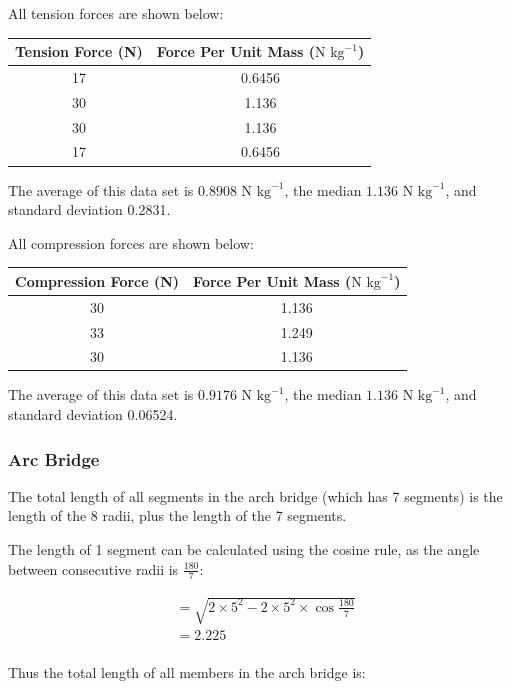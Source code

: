 \documentclass[a4paper,11pt]{article}
\begin{document}
All tension forces are shown below:

\begin{center}
\begin{tabular}{|c|c|}
\hline
Tension Force (N) & Force Per Unit Mass ($\mbox{N kg}^{-1}$) \\
\hline
17 & 0.6456 \\
30 & 1.136 \\
30 & 1.136 \\
17 & 0.6456 \\
\hline
\end{tabular}
\end{center}

The average of this data set is $0.8908\mbox{ N kg}^{-1}$, the median
$1.136\mbox{ N kg}^{-1}$, and standard deviation 0.2831.

All compression forces are shown below:

\begin{center}
\begin{tabular}{|c|c|}
\hline
Compression Force (N) & Force Per Unit Mass ($\mbox{N kg}^{-1}$) \\
\hline
30 & 1.136 \\
33 & 1.249 \\
30 & 1.136 \\
\hline
\end{tabular}
\end{center}

The average of this data set is $0.9176\mbox{ N kg}^{-1}$, the median
$1.136\mbox{ N kg}^{-1}$, and standard deviation 0.06524.


\subsubsection{Arc Bridge}

The total length of all segments in the arch bridge (which has 7 segments) is
the length of the 8 radii, plus the length of the 7 segments.

The length of 1 segment can be calculated using the cosine rule, as the angle
between consecutive radii is $\frac{180}{7}$:

$$
\begin{aligned}
& = \sqrt{2 \times 5^2 - 2 \times 5^2 \times \cos{\frac{180}{7}}} \\
& = 2.225 \\
\end{aligned}
$$

Thus the total length of all members in the arch bridge is:
\end{document}
